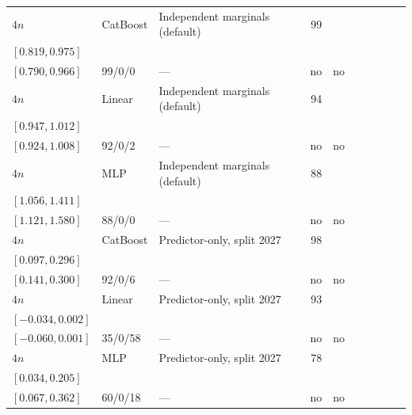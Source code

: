 \begin{longtable}{@{}ll>{\raggedright\arraybackslash}p{1.1in}rllrlll@{}}
$4n$ & CatBoost & Independent marginals (default) & 99 & \begin{tabular}[t]{@{}l@{}}$0.917$\\\tiny$[0.819, 0.975]$\end{tabular} & \begin{tabular}[t]{@{}l@{}}$0.884$\\\tiny$[0.790, 0.966]$\end{tabular} & 99/0/0 & --- & no & no \\
$4n$ & Linear & Independent marginals (default) & 94 & \begin{tabular}[t]{@{}l@{}}$0.978$\\\tiny$[0.947, 1.012]$\end{tabular} & \begin{tabular}[t]{@{}l@{}}$0.982$\\\tiny$[0.924, 1.008]$\end{tabular} & 92/0/2 & --- & no & no \\
$4n$ & MLP & Independent marginals (default) & 88 & \begin{tabular}[t]{@{}l@{}}$1.188$\\\tiny$[1.056, 1.411]$\end{tabular} & \begin{tabular}[t]{@{}l@{}}$1.305$\\\tiny$[1.121, 1.580]$\end{tabular} & 88/0/0 & --- & no & no \\
$4n$ & CatBoost & Predictor-only, split 2027 & 98 & \begin{tabular}[t]{@{}l@{}}$0.215$\\\tiny$[0.097, 0.296]$\end{tabular} & \begin{tabular}[t]{@{}l@{}}$0.229$\\\tiny$[0.141, 0.300]$\end{tabular} & 92/0/6 & --- & no & no \\
$4n$ & Linear & Predictor-only, split 2027 & 93 & \begin{tabular}[t]{@{}l@{}}$-0.009$\\\tiny$[-0.034, 0.002]$\end{tabular} & \begin{tabular}[t]{@{}l@{}}$-0.015$\\\tiny$[-0.060, 0.001]$\end{tabular} & 35/0/58 & --- & no & no \\
$4n$ & MLP & Predictor-only, split 2027 & 78 & \begin{tabular}[t]{@{}l@{}}$0.103$\\\tiny$[0.034, 0.205]$\end{tabular} & \begin{tabular}[t]{@{}l@{}}$0.194$\\\tiny$[0.067, 0.362]$\end{tabular} & 60/0/18 & --- & no & no \\

\end{longtable}

